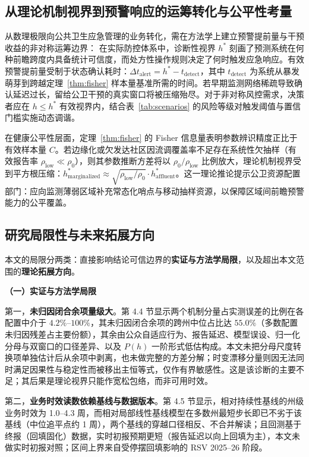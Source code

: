 \documentclass[10pt,a4paper]{article}
\theoremstyle{plain}
\theoremstyle{definition}
\begin{document}
\subsection{从理论机制视界到预警响应的运筹转化与公平性考量}\label{sec:operational_translation}

从数理极限向公共卫生应急管理的业务转化，需在方法学上建立预警提前量与干预收益的非对称运筹边界\citep{parag2025asymmetric}：
在实际防控体系中，诊断性视界 $h^*$ 刻画了预测系统在何种前瞻跨度内具备统计可信度，而处方性操作规则决定了何时触发应急响应。有效预警提前量受制于状态确认耗时：$\Delta t_{\text{alert}} = h^* - t_{\text{detect}}$，其中 $t_{\text{detect}}$ 为系统从暴发萌芽到跨越定理~\ref{thm:fisher} 样本量基准所需的时间。若早期监测网络稀疏导致确认延迟过长，留给公卫干预的真实窗口将被压缩殆尽。对于非对称风控需求，决策者应在 $h \le h^*$ 有效视界内，结合表~\ref{tab:scenarios} 的风险等级对触发阈值与置信门槛实施动态调谐。

在健康公平性层面，定理~\ref{thm:fisher} 的 Fisher 信息量表明参数辨识精度正比于有效样本量 $C$。若边缘化或欠发达社区因流调覆盖率不足存在系统性欠抽样（有效报告率 $\rho_{\text{low}} \ll \rho_0$），则其参数推断方差将以 $\rho_0/\rho_{\text{low}}$ 比例放大，理论机制视界受到平方根压缩：$h^*_{\text{marginalized}} \approx \sqrt{\rho_{\text{low}}/\rho_0} \cdot h^*_{\text{affluent}}$。这一理论推论提示公卫资源配置部门：应向监测薄弱区域补充常态化哨点与移动抽样资源，以保障区域间前瞻预警能力的公平覆盖。

\subsection{研究局限性与未来拓展方向}

本文的局限分两类：直接影响结论可信边界的\textbf{实证与方法学局限}，以及超出本文范围的\textbf{理论拓展方向}。

\noindent\textbf{（一）实证与方法学局限}

第一，\textbf{未归因闭合余项量级大}。第 4.4 节显示两个机制分量占实测误差的比例在各配置中介于 $4.2\%$--$100\%$，其未归因闭合余项的跨州中位占比达 $55.0\%$（多数配置未归因残差占主要份额），其余由公众自适应行为、报告延迟、模型误设、归一化分母与双窗口的口径差异、以及 $P(h)$ 一阶形式低估构成。本文未把分母尺度转换项单独估计后从余项中剥离，也未做完整的方差分解；时变漂移分量则因无法同时满足因果性与稳定性而被移出主恒等式，仅作有界敏感性。这是该诊断的主要不足；其后果是理论视界只能作宽松包络，而非可用时效。

第二，\textbf{业务时效读数依赖基线与数据版本}。第 4.5 节显示，相对持续性基线的州级业务时效为 1.0--4.3 周，而相对局部线性基线模型在多数州最短步长即已不劣于该基线（中位追平点约 1 周），两个基线的穿越口径相反、不合并解读；且回测基于终报（回填固化）数据，实时初报预期更短（报告延迟以向上回填为主），本文未做实时初报对照；区间上界来自受停摆回填影响的 RSV 2025--26 阶段。
\end{document}
